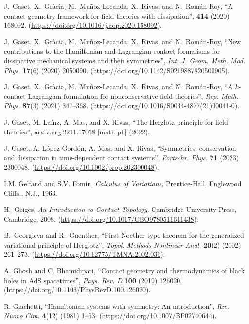 \documentclass[12pt]{report}
\begin{document}
\begin{thebibliography}{999}
J.~{Gaset}, X.~{Gr\`acia}, M.~{Mu\~noz-Lecanda}, X.~{Rivas}, and N.~{Rom\'an-Roy},
``A contact geometry framework for field theories with dissipation'',
 {\bf 414} (2020) 168092.
(\url{https://doi.org/10.1016/j.aop.2020.168092}).

J.~{Gaset}, X.~{Gr\`acia}, M.~{Mu\~noz-Lecanda}, X.~{Rivas}, and N.~{Rom\'an-Roy},
``New contributions to the Hamiltonian and Lagrangian contact formalisms for dissipative mechanical systems and their symmetries'',
{\sl Int. J. Geom. Meth. Mod. Phys.} {\bf 17}(6) (2020) 2050090.
(\url{https://doi.org/10.1142/S0219887820500905}).

J.~{Gaset}, X.~{Gr\`acia}, M.~{Mu\~noz-Lecanda}, X.~{Rivas}, and N.~{Rom\'an-Roy},
``A $k$-contact Lagrangian formulation for nonconservative field theories'',
{\sl Rep. Math. Phys.} {\bf 87}(3) (2021) 347--368.
(\url{https://doi.org/10.1016/S0034-4877(21)00041-0}).

J. Gaset, M. La\'inz, A. Mas, and X. Rivas,
``The Herglotz principle for field theories'', 
arxiv.org:2211.17058 [math-ph] (2022).

J. Gaset, A. L\'opez-Gord\'on, A. Mas, and X. Rivas,
``Symmetries, conservation and dissipation in time-dependent contact systems'', {\sl Fortschr. Phys.} {\bf 71} (2023) 2300048.
(\url{https://doi.org/10.1002/prop.202300048}).

I.M. Gelfand and S.V. Fomin, 
{\it Calculus of Variations},
Prentice-Hall, Englewood Cliffs., N.J., 1963.

H.~Geiges,
{\em An Introduction to Contact Topology}.
Cambridge University Press, Cambridge, 2008.
(\url{https://doi.org/10.1017/CBO9780511611438}).

B.~Georgieva and R.~Guenther,
``First {N}oether-type theorem for the generalized variational
  principle of {H}erglotz'',
{\sl Topol. Methods Nonlinear Anal.} {\bf 20}(2) (2002) 261--273.
(\url{https://doi.org/10.12775/TMNA.2002.036}).

A. Ghosh and C. Bhamidipati,
``Contact geometry and thermodynamics of black holes in AdS spacetimes'',
{\sl Phys. Rev. D} {\bf 100} (2019) 126020.
(\url{https://doi.org/10.1103/PhysRevD.100.126020}).

R. Giachetti,
``Hamiltonian systems with symmetry: An introduction'',
{\sl Riv. Nuovo Cim.} {\bf 4}(12) (1981) 1--63.
(\url{https://doi.org/10.1007/BF02740644}).


\end{thebibliography}
\end{document}
